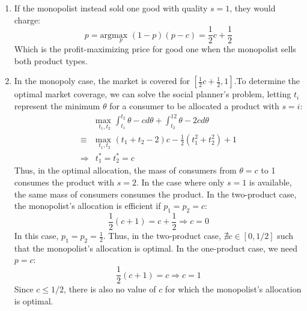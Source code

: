 \documentclass{article}
\newcommand{\usmax}[1]{\underset{#1}{\text{max }}}
\newcommand*\colvec[1]{
        \global\colveccount#1
        \begin{pmatrix}
        \colvecnext
}
\def\colvecnext#1{
        #1
        \global\advance\colveccount-1
        \ifnum\colveccount>0
                \\
                \expandafter\colvecnext
        \else
                \end{pmatrix}
        \fi
}
\begin{document}
\begin{enumerate}
\begin{enumerate}
    Consider a monopolist that offers both goods. The monopolist solves:\begin{align*}
      &\usmax{p_1, p_2} (p_2-p_1)(p_1-c) + (1-2p_2+p_1)(p_2-2c)  \\
      &p_1: -2p_1 + 2p_2 - c = 0  \\
      &p_2: 2p_1 - 4p_2 + 3c +1 = 0
    \end{align*}
    Rearranging the first order conditions, we can solve for optimal $p_1$ and $p_2$:\begin{align*}
      \begin{pmatrix}
        -2 & 2 \\ 2 & -4
      \end{pmatrix}\colvec{2}{p_1}{p_2} &= \colvec{2}{c}{-3c-1} \\
      \colvec{2}{p_1}{p_2}              &= \colvec{2}{\frac{1}{2}c + \frac{1}{2}}{c + \frac{1}{2}}
    \end{align*}

    \item If the monopolist instead sold one good with quality ${s=1}$, they would charge:\[
      p=\text{arg}\usmax{p}(1-p)(p-c) = \frac{1}{2}c + \frac{1}{2}
    \]
    Which is the profit-maximizing price for good one when the monopolist sells both product types.

    \item In the monopoly case, the market is covered for ${[\frac{1}{2}c + \frac{1}{2}, 1]}$.To determine the optimal market coverage, we can solve the social planner's problem, letting $t_i$ represent the minimum $\theta$ for a consumer to be allocated a product with ${s=i}$: \begin{align*}
      &\usmax{t_1, t_2} \int_{t_1}^{t_2}\theta-cd\theta + \int_{t_2}^12\theta-2cd\theta \\
      \equiv &\usmax{t_1, t_2} (t_1 + t_2 - 2)c - \frac{1}{2}(t_1^2 + t_2^2) + 1          \\
      \Rightarrow & t_1^*=t_2^*=c
    \end{align*}
    Thus, in the optimal allocation, the mass of consumers from ${\theta=c}$ to 1 consumes the product with ${s=2}$. In the case where only ${s=1}$ is available, the same mass of consumers consumes the product. In the two-product case, the monopolist's allocation is efficient if ${p_1=p_2=c}$: \[
      \frac{1}{2}(c + 1)  = c + \frac{1}{2}  \Rightarrow c = 0
    \]
    In this case, $p_1=p_2=\frac{1}{2}$. Thus, in the two-product case, ${\nexists c\in[0,1/2]}$ such that the monopolist's allocation is optimal. In the one-product case, we need ${p=c}$:\[
      \frac{1}{2}(c+1) = c  \Rightarrow c=1
    \]
    Since $c\leq1/2$, there is also no value of $c$ for which the monopolist's allocation is optimal.


\end{enumerate}
\end{enumerate}
\end{document}
